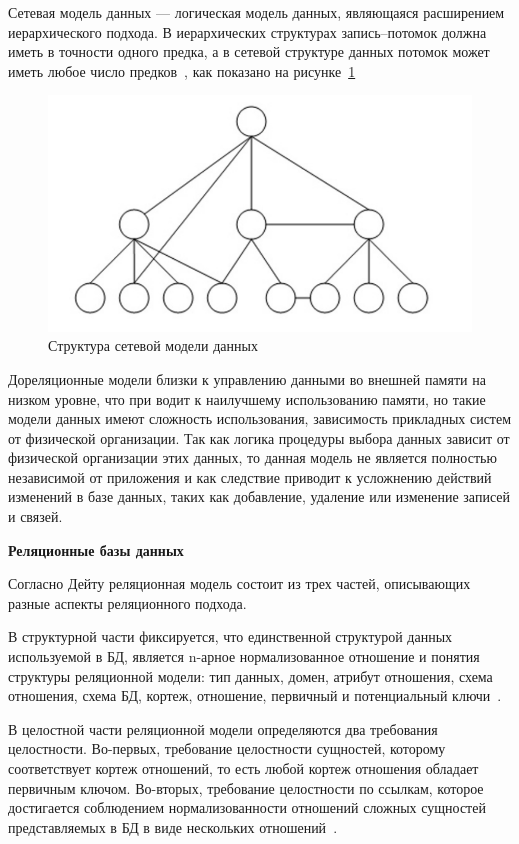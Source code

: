 Сетевая модель данных --- логическая модель данных, являющаяся расширением иерархического подхода. 
В иерархических структурах запись--потомок должна иметь в точности одного предка, а в сетевой структуре данных потомок может иметь любое число предков~\cite{kuznecov-db}, как показано на рисунке~\ref{fig:network-db} 

\begin{figure}[h]
	\centering
	\includegraphics[height=0.2\textheight]{img/network-db.png}
	\caption{Структура сетевой модели данных}
	\label{fig:network-db}
\end{figure}

Дореляционные модели близки к управлению данными во внешней памяти на низком уровне, что при водит к наилучшему использованию памяти, но такие модели данных имеют сложность  использования, зависимость прикладных систем от физической организации. Так как логика процедуры выбора данных зависит от физической организации этих данных, то данная модель не является полностью независимой от приложения и как следствие приводит к усложнению действий изменений в базе данных, таких как добавление, удаление или изменение записей и связей.

\clearpage

\textbf{Реляционные базы данных}

Согласно Дейту реляционная модель состоит из трех частей, описывающих разные аспекты реляционного подхода.
 
В структурной части фиксируется, что единственной структурой данных используемой в БД, является n-арное нормализованное отношение и понятия структуры реляционной модели: тип данных, домен, атрибут отношения, схема отношения, схема БД, кортеж, отношение, первичный и потенциальный ключи~\cite{kuznecov-db}.

В целостной части реляционной модели определяются два требования целостности. 
Во-первых, требование целостности сущностей, которому соответствует кортеж отношений, то есть любой кортеж отношения обладает первичным ключом. Во-вторых, требование целостности по ссылкам, которое достигается соблюдением нормализованности отношений сложных сущностей представляемых в БД в виде нескольких отношений~\cite{kuznecov-db}.


